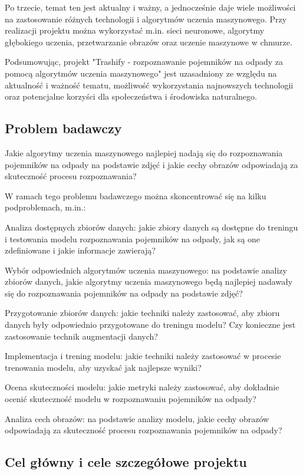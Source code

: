 \documentclass[12pt,oneside]{book}
\begin{document}
Po trzecie, temat ten jest aktualny i ważny, a jednocześnie daje wiele możliwości na zastosowanie różnych technologii i algorytmów uczenia maszynowego. Przy realizacji projektu można wykorzystać m.in. sieci neuronowe, algorytmy głębokiego uczenia, przetwarzanie obrazów oraz uczenie maszynowe w chmurze.

Podsumowując, projekt "Trashify - rozpoznawanie pojemników na odpady za pomocą algorytmów uczenia maszynowego" jest uzasadniony ze względu na aktualność i ważność tematu, możliwość wykorzystania najnowszych technologii oraz potencjalne korzyści dla społeczeństwa i środowiska naturalnego.

\subsection{Problem badawczy}
Jakie algorytmy uczenia maszynowego najlepiej nadają się do rozpoznawania pojemników na odpady na podstawie zdjęć i jakie cechy obrazów odpowiadają za skuteczność procesu rozpoznawania?

W ramach tego problemu badawczego można skoncentrować się na kilku podproblemach, m.in.:

    Analiza dostępnych zbiorów danych: jakie zbiory danych są dostępne do treningu i testowania modelu rozpoznawania pojemników na odpady, jak są one zdefiniowane i jakie informacje zawierają?

    Wybór odpowiednich algorytmów uczenia maszynowego: na podstawie analizy zbiorów danych, jakie algorytmy uczenia maszynowego będą najlepiej nadawały się do rozpoznawania pojemników na odpady na podstawie zdjęć?

    Przygotowanie zbiorów danych: jakie techniki należy zastosować, aby zbioru danych były odpowiednio przygotowane do treningu modelu? Czy konieczne jest zastosowanie technik augmentacji danych?

    Implementacja i trening modelu: jakie techniki należy zastosować w procesie trenowania modelu, aby uzyskać jak najlepsze wyniki?

    Ocena skuteczności modelu: jakie metryki należy zastosować, aby dokładnie ocenić skuteczność modelu w rozpoznawaniu pojemników na odpady?

    Analiza cech obrazów: na podstawie analizy modelu, jakie cechy obrazów odpowiadają za skuteczność procesu rozpoznawania pojemników na odpady?

\subsection{Cel główny i cele szczegółowe projektu}
\end{document}
